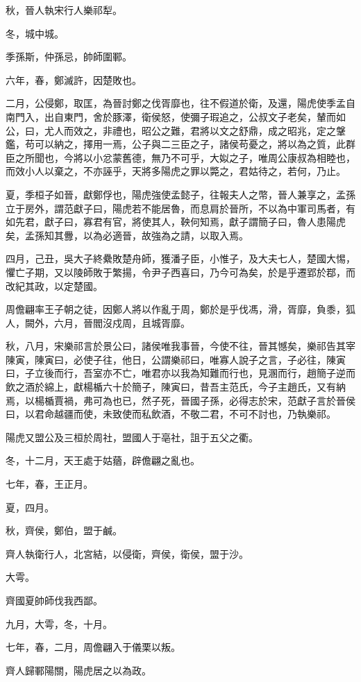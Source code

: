 \begin{pinyinscope}
秋，晉人執宋行人樂祁犁。

冬，城中城。

季孫斯，仲孫忌，帥師圍鄆。

六年，春，鄭滅許，因楚敗也。

二月，公侵鄭，取匡，為晉討鄭之伐胥靡也，往不假道於衛，及還，陽虎使季孟自南門入，出自東門，舍於豚澤，衛侯怒，使彌子瑕追之，公叔文子老矣，輦而如公，曰，尤人而效之，非禮也，昭公之難，君將以文之舒鼎，成之昭兆，定之鞶鑑，苟可以納之，擇用一焉，公子與二三臣之子，諸侯苟憂之，將以為之質，此群臣之所聞也，今將以小忿蒙舊德，無乃不可乎，大姒之子，唯周公康叔為相睦也，而效小人以棄之，不亦誣乎，天將多陽虎之罪以斃之，君姑待之，若何，乃止。

夏，季桓子如晉，獻鄭俘也，陽虎強使孟懿子，往報夫人之幣，晉人兼享之，孟孫立于房外，謂范獻子曰，陽虎若不能居魯，而息肩於晉所，不以為中軍司馬者，有如先君，獻子曰，寡君有官，將使其人，鞅何知焉，獻子謂簡子曰，魯人患陽虎矣，孟孫知其釁，以為必適晉，故強為之請，以取入焉。

四月，己丑，吳大子終纍敗楚舟師，獲潘子臣，小惟子，及大夫七人，楚國大惕，懼亡子期，又以陵師敗于繁揚，令尹子西喜曰，乃今可為矣，於是乎遷郢於鄀，而改紀其政，以定楚國。

周儋翩率王子朝之徒，因鄭人將以作亂于周，鄭於是乎伐馮，滑，胥靡，負黍，狐人，闕外，六月，晉閻沒戍周，且城胥靡。

秋，八月，宋樂祁言於景公曰，諸侯唯我事晉，今使不往，晉其憾矣，樂祁告其宰陳寅，陳寅曰，必使子往，他日，公謂樂祁曰，唯寡人說子之言，子必往，陳寅曰，子立後而行，吾室亦不亡，唯君亦以我為知難而行也，見溷而行，趙簡子逆而飲之酒於綿上，獻楊楯六十於簡子，陳寅曰，昔吾主范氏，今子主趙氏，又有納焉，以楊楯賈禍，弗可為也已，然子死，晉國子孫，必得志於宋，范獻子言於晉侯曰，以君命越疆而使，未致使而私飲酒，不敬二君，不可不討也，乃執樂祁。

陽虎又盟公及三桓於周社，盟國人于亳社，詛于五父之衢。

冬，十二月，天王處于姑蕕，辟儋翩之亂也。

七年，春，王正月。

夏，四月。

秋，齊侯，鄭伯，盟于鹹。

齊人執衛行人，北宮結，以侵衛，齊侯，衛侯，盟于沙。

大雩。

齊國夏帥師伐我西鄙。

九月，大雩，冬，十月。

七年，春，二月，周儋翩入于儀栗以叛。

齊人歸鄆陽關，陽虎居之以為政。


\end{pinyinscope}
